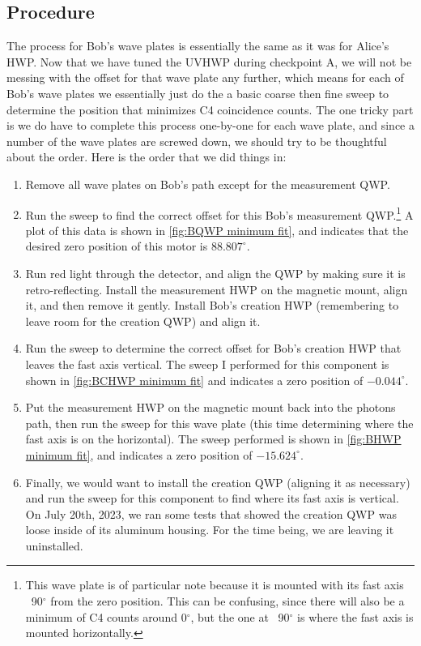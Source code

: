 \documentclass{paper}[11pt]
\begin{document}
	\subsection{Procedure}
	The process for Bob's wave plates is essentially the same as it was for Alice's HWP. Now that we have tuned the UVHWP during checkpoint A, we will not be messing with the offset for that wave plate any further, which means for each of Bob's wave plates we essentially just do the a basic coarse then fine sweep to determine the position that minimizes C4 coincidence counts. The one tricky part is we do have to complete this process one-by-one for each wave plate, and since a number of the wave plates are screwed down, we should try to be thoughtful about the order. Here is the order that we did things in:
	\begin{enumerate}
		\item Remove all wave plates on Bob's path except for the measurement QWP.
		\item Run the sweep to find the correct offset for this Bob's measurement QWP.\footnote{This wave plate is of particular note because it is mounted with its fast axis ~90$^\circ$ from the zero position. This can be confusing, since there will also be a minimum of C4 counts around 0$^\circ$, but the one at ~90$^\circ$ is where the fast axis is mounted horizontally.} A plot of this data is shown in \cref{fig:BQWP minimum fit}, and indicates that the desired zero position of this motor is $88.807^\circ$.
		\item Run red light through the detector, and align the QWP by making sure it is retro-reflecting. Install the measurement HWP on the magnetic mount, align it, and then remove it gently. Install Bob's creation HWP (remembering to leave room for the creation QWP) and align it.
		\item Run the sweep to determine the correct offset for Bob's creation HWP that leaves the fast axis vertical. The sweep I performed for this component is shown in \cref{fig:BCHWP minimum fit} and indicates a zero position of $-0.044^\circ$.
		\item Put the measurement HWP on the magnetic mount back into the photons path, then run the sweep for this wave plate (this time determining where the fast axis is on the horizontal). The sweep performed is shown in \cref{fig:BHWP minimum fit}, and indicates a zero position of $-15.624^\circ$.
		\item Finally, we would want to install the creation QWP (aligning it as necessary) and run the sweep for this component to find where its fast axis is vertical. On July 20th, 2023, we ran some tests that showed the creation QWP was loose inside of its aluminum housing. For the time being, we are leaving it uninstalled.
	\end{enumerate}
	
\end{document}

